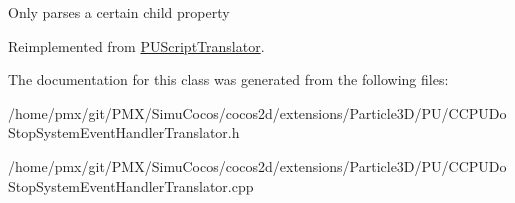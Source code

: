 Only parses a certain child property 

Reimplemented from \hyperlink{classPUScriptTranslator_a0374d83a8a04e57918975d525e0f8fe8}{P\+U\+Script\+Translator}.



The documentation for this class was generated from the following files\+:\begin{DoxyCompactItemize}
\item 
/home/pmx/git/\+P\+M\+X/\+Simu\+Cocos/cocos2d/extensions/\+Particle3\+D/\+P\+U/C\+C\+P\+U\+Do\+Stop\+System\+Event\+Handler\+Translator.\+h\item 
/home/pmx/git/\+P\+M\+X/\+Simu\+Cocos/cocos2d/extensions/\+Particle3\+D/\+P\+U/C\+C\+P\+U\+Do\+Stop\+System\+Event\+Handler\+Translator.\+cpp\end{DoxyCompactItemize}
